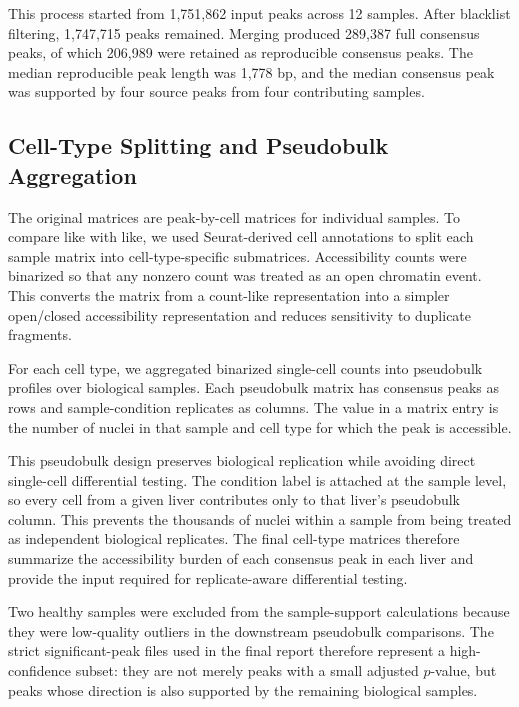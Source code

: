 \documentclass[11pt]{article}
\begin{document}
  This process started from 1,751,862 input peaks across 12 samples.
  After blacklist filtering, 1,747,715 peaks remained.
  Merging produced 289,387 full consensus peaks, of which 206,989 were retained as reproducible consensus peaks.
  The median reproducible peak length was 1,778 bp, and the median consensus peak was supported by four source peaks from four contributing samples.

  \subsection{Cell-Type Splitting and Pseudobulk Aggregation}\label{subsec:cell-type-splitting-and-pseudobulk-aggregation}
  The original matrices are peak-by-cell matrices for individual samples.
  To compare like with like, we used Seurat-derived cell annotations to split each sample matrix into cell-type-specific submatrices.
  Accessibility counts were binarized so that any nonzero count was treated as an open chromatin event.
  This converts the matrix from a count-like representation into a simpler open/closed accessibility representation and reduces sensitivity to duplicate fragments.

  For each cell type, we aggregated binarized single-cell counts into pseudobulk profiles over biological samples.
  Each pseudobulk matrix has consensus peaks as rows and sample-condition replicates as columns.
  The value in a matrix entry is the number of nuclei in that sample and cell type for which the peak is accessible.

  This pseudobulk design preserves biological replication while avoiding direct single-cell differential testing.
  The condition label is attached at the sample level, so every cell from a given liver contributes only to that liver's pseudobulk column.
  This prevents the thousands of nuclei within a sample from being treated as independent biological replicates.
  The final cell-type matrices therefore summarize the accessibility burden of each consensus peak in each liver and provide the input required for replicate-aware differential testing.

  Two healthy samples were excluded from the sample-support calculations because they were low-quality outliers in the downstream pseudobulk comparisons.
  The strict significant-peak files used in the final report therefore represent a high-confidence subset: they are not merely peaks with a small adjusted $p$-value, but peaks whose direction is also supported by the remaining biological samples.
\end{document}
